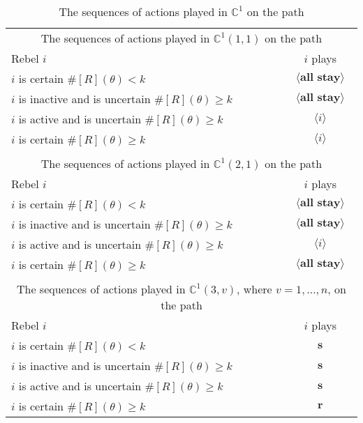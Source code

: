 \documentclass[12pt,letter]{article}
\newcommand{\Kappa}{\mathbb{C}}
\theoremstyle{definition}
\theoremstyle{remark}
\theoremstyle{claim}
\begin{document}
\begin{table}[!htbp]
\caption{The sequences of actions played in $\Kappa^1$ on the path}
\label{Table_cd0}
\begin{center}
\begin{tabular}{l c}
\multicolumn{2}{c}{The sequences of actions played in $\Kappa^1(1,1)$ on the path}\\
Rebel $i$ 	 	&  	$i$ plays		 \\
\hline
\hline
$i$ is certain $\#[R](\theta)<k$ 	& 	$\langle \textbf{all stay} \rangle$	\\
$i$ is inactive and is uncertain $\#[R](\theta)\geq k$	& 	$\langle \textbf{all stay} \rangle$	\\
$i$ is active and is uncertain $\#[R](\theta)\geq k$ &  $\langle i \rangle$  \\
$i$ is certain $\#[R](\theta)\geq k$ &  $\langle i \rangle$  \\
\hline
\\
\multicolumn{2}{c}{The sequences of actions played in $\Kappa^1(2,1)$ on the path}\\
Rebel $i$ 	 	&  	$i$ plays		 \\
\hline
\hline
$i$ is certain $\#[R](\theta)<k$ 	& 	$\langle \textbf{all stay} \rangle$	\\
$i$ is inactive and is uncertain $\#[R](\theta)\geq k$	& 	$\langle \textbf{all stay} \rangle$	\\
$i$ is active and is uncertain $\#[R](\theta)\geq k$ &  $\langle i \rangle$  \\
$i$ is certain $\#[R](\theta)\geq k$ &  $\langle \textbf{all stay} \rangle$  \\
\hline
\\
\multicolumn{2}{c}{The sequences of actions played in $\Kappa^1(3,v)$, where $v=1,...,n$, on the path}\\
Rebel $i$ 	 	&  	$i$ plays		 \\
\hline
\hline
$i$ is certain $\#[R](\theta)<k$ 	& 	$ \textbf{s} $	\\
$i$ is inactive and is uncertain $\#[R](\theta)\geq k$	& 	$ \textbf{s} $	\\
$i$ is active and is uncertain $\#[R](\theta)\geq k$ &  $ \textbf{s} $  \\
$i$ is certain $\#[R](\theta)\geq k$ &  $ \textbf{r} $  \\
\hline
\end{tabular}
\end{center}
\end{table}
\end{document}
